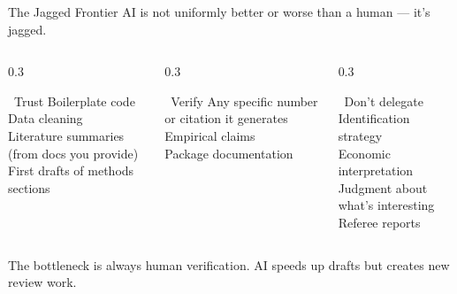 \documentclass[aspectratio=169, 10pt]{beamer}
\begin{document}
\begin{frame}{The Jagged Frontier}
  AI is not uniformly better or worse than a human --- it's \alert{jagged}.

  \vspace{0.5em}
  \begin{columns}[T]
    \begin{column}{0.3\textwidth}
      \begin{exampleblock}{\faCheckCircle\ Trust}
        \small Boilerplate code\\
        Data cleaning\\
        Literature summaries (from docs you provide)\\
        First drafts of methods sections
      \end{exampleblock}
    \end{column}
    \begin{column}{0.3\textwidth}
      \begin{block}{\faSearch\ Verify}
        \small Any specific number or citation it generates\\
        Empirical claims\\
        Package documentation
      \end{block}
    \end{column}
    \begin{column}{0.3\textwidth}
      \begin{alertblock}{\faTimes\ Don't delegate}
        \small Identification strategy\\
        Economic interpretation\\
        Judgment about what's interesting\\
        Referee reports
      \end{alertblock}
    \end{column}
  \end{columns}

  \vspace{0.5em}
  \begin{findingbox}
    The bottleneck is always human verification.
    AI speeds up drafts but creates new review work.
  \end{findingbox}
\end{frame}
\end{document}
